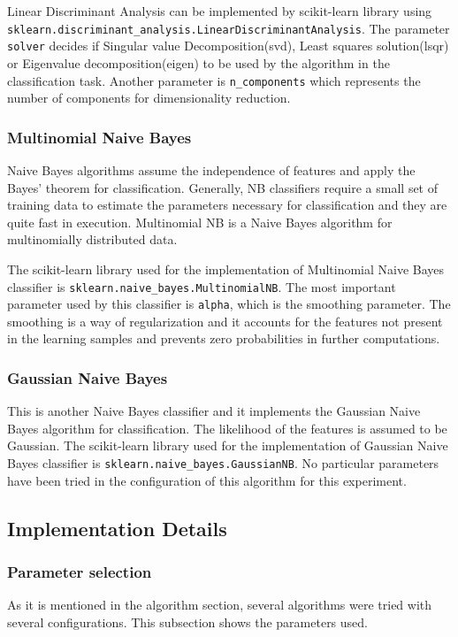\documentclass[letterpaper,10pt]{article}
\theoremstyle{mytheor}
\begin{document}
Linear Discriminant Analysis can be implemented by scikit-learn library using \lstinline|sklearn.discriminant_analysis.LinearDiscriminantAnalysis|. The parameter \lstinline|solver| decides if Singular value Decomposition(svd), Least squares solution(lsqr) or Eigenvalue decomposition(eigen) to be used by the algorithm in the classification task. Another parameter is \lstinline|n_components| which represents the number of components for dimensionality reduction.

\subsubsection{Multinomial Naive Bayes}
Naive Bayes algorithms assume the independence of features and apply the Bayes’ theorem for classification. Generally, NB classifiers require a small set of training data to estimate the parameters necessary for classification and they are quite fast in execution. Multinomial NB is a Naive Bayes algorithm for multinomially distributed data.

The scikit-learn library used for the implementation of Multinomial Naive Bayes classifier is \lstinline|sklearn.naive_bayes.MultinomialNB|. The most important parameter used by this classifier is \lstinline|alpha|, which is the smoothing parameter. The smoothing is a way of regularization and it accounts for the features not present in the learning samples and prevents zero probabilities in further computations.

\subsubsection{Gaussian Naive Bayes}
This is another Naive Bayes classifier and it implements the Gaussian Naive Bayes algorithm for classification. The likelihood of the features is assumed to be Gaussian. The scikit-learn library used for the implementation of Gaussian Naive Bayes classifier is \lstinline|sklearn.naive_bayes.GaussianNB|. No particular parameters have been tried in the configuration of this algorithm for this experiment.

\subsection{Implementation Details}

\subsubsection{Parameter selection}
As it is mentioned in the algorithm section, several algorithms were tried with several configurations. This subsection shows the parameters used.
\end{document}

